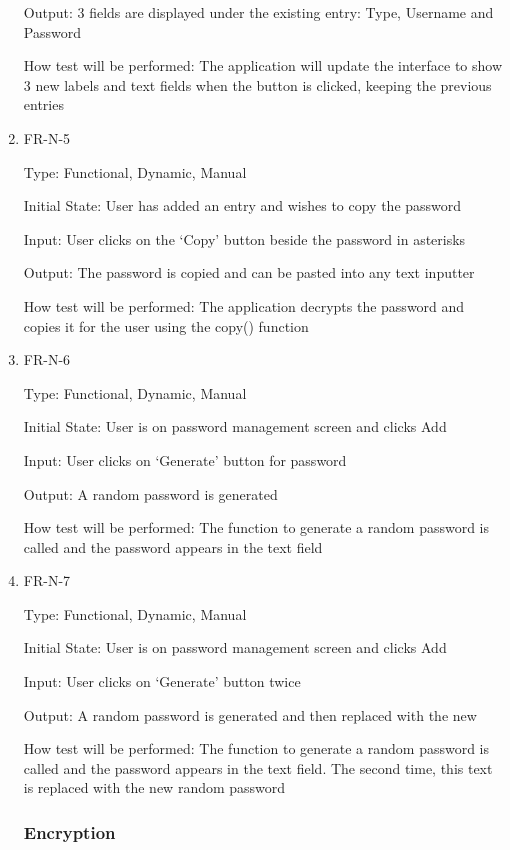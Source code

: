 \documentclass[12pt, titlepage]{article}
\begin{document}
\begin{enumerate}
Output: 3 fields are displayed under the existing entry: Type, Username and Password

How test will be performed: The application will update the interface to show 3 new labels and text fields when the button is clicked, keeping the previous entries

\item{FR-N-5\\}

Type: Functional, Dynamic, Manual

Initial State: User has added an entry and wishes to copy the password

Input: User clicks on the ‘Copy’ button beside the password in asterisks

Output: The password is copied and can be pasted into any text inputter

How test will be performed: The application decrypts the password and copies it for the user using the copy() function

\item{FR-N-6\\}

Type: Functional, Dynamic, Manual

Initial State: User is on password management screen and clicks Add

Input: User clicks on ‘Generate’ button for password

Output: A random password is generated

How test will be performed: The function to generate a random password is called and the password appears in the text field

\item{FR-N-7\\}

Type: Functional, Dynamic, Manual

Initial State: User is on password management screen and clicks Add

Input: User clicks on ‘Generate’ button twice

Output: A random password is generated and then replaced with the new 

How test will be performed: The function to generate a random password is called and the password appears in the text field. The second time, this text is replaced with the new random password

\subsubsection{Encryption}


\end{enumerate}
\end{document}
